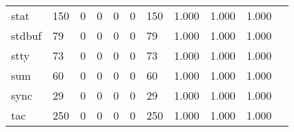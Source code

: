 \begin{longtable}{lp{1.2cm}p{1.2cm}p{1.2cm}p{1.2cm}p{1.2cm}p{1.2cm}p{1.2cm}p{1.2cm}p{1.2cm}p{1.2cm}}
stat      &                                   150 &                                                  0 &                                                  0 &                                                  0 &                                                  0 &                                                150 &                                         1.000 &                                              1.000 &                                              1.000 \\
stdbuf    &                                    79 &                                                  0 &                                                  0 &                                                  0 &                                                  0 &                                                 79 &                                         1.000 &                                              1.000 &                                              1.000 \\
stty      &                                    73 &                                                  0 &                                                  0 &                                                  0 &                                                  0 &                                                 73 &                                         1.000 &                                              1.000 &                                              1.000 \\
sum       &                                    60 &                                                  0 &                                                  0 &                                                  0 &                                                  0 &                                                 60 &                                         1.000 &                                              1.000 &                                              1.000 \\
sync      &                                    29 &                                                  0 &                                                  0 &                                                  0 &                                                  0 &                                                 29 &                                         1.000 &                                              1.000 &                                              1.000 \\
tac       &                                   250 &                                                  0 &                                                  0 &                                                  0 &                                                  0 &                                                250 &                                         1.000 &                                              1.000 &                                              1.000 \\

\end{longtable}
